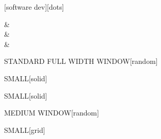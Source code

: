 \documentclass[11pt, a4paper]{article}
\begin{document}
	\noindent
	\begin{minipage}[t]{0.35\textwidth}
		\vspace{0pt}
		[software dev][dots]
	\end{minipage}
	\hfill
	\begin{minipage}[t]{0.61\textwidth}
		\vspace{0pt}
		\begin{vaporbox}[vpDeepNight][\linewidth][lines]
			 &  \\
			 &  \\
			 & 
		\end{vaporbox}
	\end{minipage}
	
	\vspace{5mm}
	
	\noindent 
	\begin{vaporwindow}[vpPink]{STANDARD FULL WIDTH WINDOW}[random]
		\lipsum[1][1-4]
	\end{vaporwindow}
	
	\noindent 
	\begin{minipage}[t]{0.28\textwidth}
		\vspace{0pt}
		\begin{vaporwindow}[vpGreen]{SMALL}[solid] 
			\lipsum[2][1-2]
		\end{vaporwindow}
		\vspace*{2mm}
		\begin{vaporwindow}[vpBlack]{SMALL}[solid] 
			\lipsum[2][3]
		\end{vaporwindow}
	\end{minipage}
	\hfill
	\begin{minipage}[t]{0.38\textwidth}
		\vspace{0pt}
		\begin{vaporwindow}[vpOrange]{MEDIUM WINDOW}[random] 
			\lipsum[2][4-15] \lipsum[3][1]
		\end{vaporwindow}
	\end{minipage}%
	\hfill
	\begin{minipage}[t]{0.28\textwidth}
		\vspace{0pt}
		\begin{vaporwindow}[vpYellow]{SMALL}[grid] 
			\lipsum[3][2-7]
		\end{vaporwindow}
	\end{minipage}
	
\end{document}
